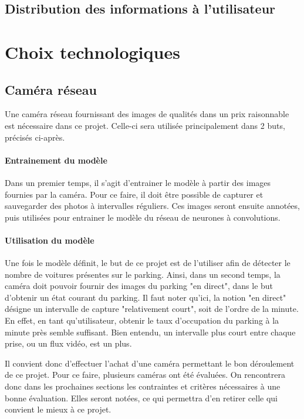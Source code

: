 \subsection{Distribution des informations à l'utilisateur}



\section{Choix technologiques}

\subsection{Caméra réseau}\label{conception.techno.camera}
Une caméra réseau fournissant des images de qualités dans un prix raisonnable est nécessaire dans ce projet. Celle-ci sera utilisée principalement dans 2 buts, précisés ci-après.

\paragraph{Entrainement du modèle}
Dans un premier temps, il s'agit d'entrainer le modèle à partir des images fournies par la caméra. Pour ce faire, il doit être possible de capturer et sauvegarder des photos à intervalles réguliers. Ces images seront ensuite annotées, puis utilisées pour entrainer le modèle du réseau de neurones à convolutions. 

\paragraph{Utilisation du modèle}
Une fois le modèle définit, le but de ce projet est de l'utiliser afin de détecter le nombre de voitures présentes sur le parking. Ainsi, dans un second temps, la caméra doit pouvoir fournir des images du parking "en direct", dans le but d'obtenir un état courant du parking. Il faut noter qu'ici, la notion "en direct" désigne un intervalle de capture "relativement court", soit de l'ordre de la minute. En effet, en tant qu'utilisateur, obtenir le taux d'occupation du parking à la minute près semble suffisant. Bien entendu, un intervalle plus court entre chaque prise, ou un flux vidéo, est un plus.

Il convient donc d'effectuer l'achat d'une caméra permettant le bon déroulement de ce projet. Pour ce faire, plusieurs caméras ont été évaluées. On rencontrera donc dans les prochaines sections les contraintes et critères nécessaires à une bonne évaluation. Elles seront notées, ce qui permettra d'en retirer celle qui convient le mieux à ce projet.

